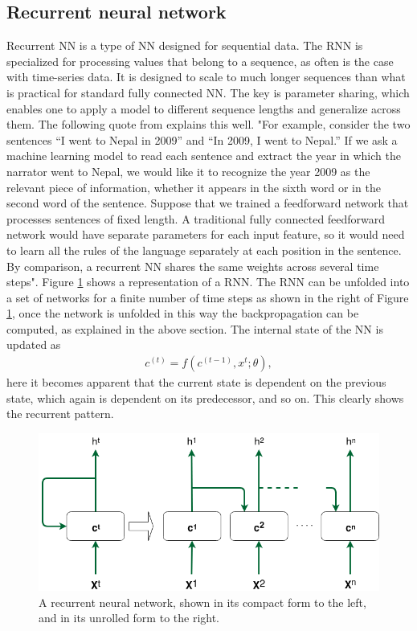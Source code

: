     
    \subsection{Recurrent neural network}\label{subsubsec:RNN}
        Recurrent NN is a type of NN designed for sequential data. The RNN is specialized for processing values that belong to a sequence, as often is the case with time-series data. It is designed to scale to much longer sequences than what is practical for standard fully connected NN. The key is parameter sharing, which enables one to apply a model to different sequence lengths and generalize across them. The following quote from \cite{Courville2016} explains this well. "For example, consider the two sentences “I went to Nepal in 2009” and “In 2009, I went to Nepal.” If we ask a machine learning model to read each sentence and extract the year in which the narrator went to Nepal, we would like it to recognize the year 2009 as the relevant piece of information, whether it appears in the sixth word or in the second word of the sentence. Suppose that we trained a feedforward network that processes sentences of fixed length. A traditional fully connected feedforward network would have separate parameters for each input feature, so it would need to learn all the rules of the language separately at each position in the sentence. By comparison, a recurrent NN shares the same weights across several time steps". Figure \ref{fig:RNN} shows a representation of a RNN. The RNN can be unfolded into a set of networks for a finite number of time steps as shown in the right of Figure \ref{fig:RNN}, once the network is unfolded in this way the backpropagation can be computed, as explained in the above section. The internal state of the NN is updated as
        \begin{align}
            c^{(t)} = f(c^{(t-1)},x^t;\theta), 
            \label{eq:RNN}
        \end{align}
        here it becomes apparent that the current state is dependent on the previous state, which again is dependent on its predecessor, and so on. This clearly shows the recurrent pattern. 
        
        
        \begin{figure}
            \centering
            \includegraphics[width=\textwidth]{report/figures/techniques/RNN.png}
            \caption{A recurrent neural network, shown in its compact form to the left, and in its unrolled form to the right.}
            \label{fig:RNN}
        \end{figure}
    
